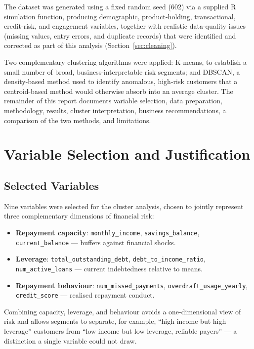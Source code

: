\documentclass[11pt]{article}
\begin{document}
The dataset was generated using a fixed random seed (602) via a supplied R simulation function, producing demographic, product-holding, transactional, credit-risk, and engagement variables, together with realistic data-quality issues (missing values, entry errors, and duplicate records) that were identified and corrected as part of this analysis (Section~\ref{sec:cleaning}).

Two complementary clustering algorithms were applied: K-means, to establish a small number of broad, business-interpretable risk segments; and DBSCAN, a density-based method used to identify anomalous, high-risk customers that a centroid-based method would otherwise absorb into an average cluster. The remainder of this report documents variable selection, data preparation, methodology, results, cluster interpretation, business recommendations, a comparison of the two methods, and limitations.

\section{Variable Selection and Justification}

\subsection{Selected Variables}

Nine variables were selected for the cluster analysis, chosen to jointly represent three complementary dimensions of financial risk:

\begin{itemize}[leftmargin=1.4em]
  \item \textbf{Repayment capacity}: \texttt{monthly\_income}, \texttt{savings\_balance}, \texttt{current\_balance} --- buffers against financial shocks.
  \item \textbf{Leverage}: \texttt{total\_outstanding\_debt}, \texttt{debt\_to\_income\_ratio}, \texttt{num\_active\_loans} --- current indebtedness relative to means.
  \item \textbf{Repayment behaviour}: \texttt{num\_missed\_payments}, \texttt{overdraft\_usage\_yearly}, \texttt{credit\_score} --- realised repayment conduct.
\end{itemize}

Combining capacity, leverage, and behaviour avoids a one-dimensional view of risk and allows segments to separate, for example, ``high income but high leverage'' customers from ``low income but low leverage, reliable payers'' --- a distinction a single variable could not draw.
\end{document}
